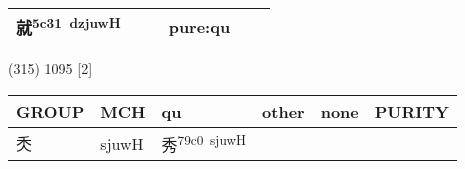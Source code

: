 \documentclass[14pt,a4paper]{scrartcl}
\begin{document}
\begin{longtable}[c]{@{}llllll@{}}
\begin{minipage}[t]{0.14\columnwidth}\raggedright\strut
就\textsuperscript{5c31~dzjuwH}
\strut\end{minipage} &
\begin{minipage}[t]{0.14\columnwidth}\raggedright\strut
\strut\end{minipage} &
\begin{minipage}[t]{0.14\columnwidth}\raggedright\strut
\strut\end{minipage} &
\begin{minipage}[t]{0.14\columnwidth}\raggedright\strut
pure:qu
\strut\end{minipage}\tabularnewline
\bottomrule
\end{longtable}

(315) 1095 {[}2{]}

\begin{longtable}[c]{@{}llllll@{}}
\toprule
\begin{minipage}[b]{0.14\columnwidth}\raggedright\strut
GROUP
\strut\end{minipage} &
\begin{minipage}[b]{0.14\columnwidth}\raggedright\strut
MCH
\strut\end{minipage} &
\begin{minipage}[b]{0.14\columnwidth}\raggedright\strut
qu
\strut\end{minipage} &
\begin{minipage}[b]{0.14\columnwidth}\raggedright\strut
other
\strut\end{minipage} &
\begin{minipage}[b]{0.14\columnwidth}\raggedright\strut
none
\strut\end{minipage} &
\begin{minipage}[b]{0.14\columnwidth}\raggedright\strut
PURITY
\strut\end{minipage}\tabularnewline
\midrule
\endhead
\begin{minipage}[t]{0.14\columnwidth}\raggedright\strut
秂
\strut\end{minipage} &
\begin{minipage}[t]{0.14\columnwidth}\raggedright\strut
sjuwH
\strut\end{minipage} &
\begin{minipage}[t]{0.14\columnwidth}\raggedright\strut
秀\textsuperscript{79c0~sjuwH}
\strut\end{minipage} &
\begin{minipage}[t]{0.14\columnwidth}\raggedright\strut
\strut\end{minipage} &

\end{longtable}
\end{document}

